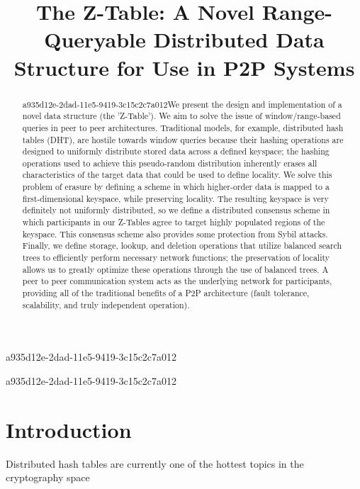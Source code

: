 \documentclass[12pt]{article}
\title{The Z-Table: A Novel Range-Queryable Distributed Data Structure for Use in P2P Systems}
\begin{document}
a935d12e-2dad-11e5-9419-3c15c2c7a012\maketitle

\begin{abstract}
a935d12e-2dad-11e5-9419-3c15c2c7a012We present the design and implementation of a novel data structure (the 'Z-Table'). We aim to solve the issue of window/range-based queries in peer to peer architectures. Traditional models, for example,  distributed hash tables (DHT), are hostile towards window queries because their hashing operations are designed to uniformly distribute stored data across a defined keyspace; the hashing operations used to achieve this pseudo-random distribution inherently erases all characteristics of the target data that could be used to define locality. We solve this problem of erasure by defining a scheme in which higher-order data is mapped to a first-dimensional keyspace, while preserving locality. The resulting keyspace is very definitely not uniformly distributed, so we define a distributed consensus scheme in which participants in our Z-Tables agree to target highly populated regions of the keyspace. This consensus scheme also provides some protection from Sybil attacks. Finally, we define storage, lookup, and deletion operations that utilize balanced search trees to efficiently perform necessary network functions; the preservation of locality allows us to greatly optimize these operations through the use of balanced trees. A peer to peer communication system acts as the underlying network for participants, providing all of the traditional benefits of a P2P architecture (fault tolerance, scalability, and truly independent operation).
\end{abstract}


a935d12e-2dad-11e5-9419-3c15c2c7a012\newpage
\section{Introduction}
Distributed hash tables are currently one of the hottest topics in the cryptography space~\cite{Stoica:2001dj,Rowstron:2001ea,Ratnasamy:2001wn}

\printbibliography
\end{document}
